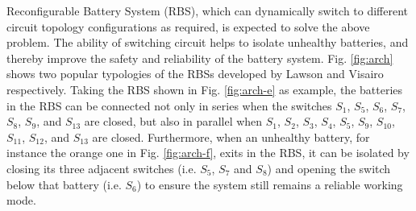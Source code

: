 \documentclass{article}
\begin{document}
Reconfigurable Battery System (RBS), which can dynamically switch to different circuit topology configurations as required, is expected to solve the above problem\cite{hanNextGenerationBatteryManagement2020a}.
The ability of switching circuit helps to isolate unhealthy batteries, and thereby improve the safety and reliability of the battery system.
Fig. \ref{fig:arch} shows two popular typologies of the RBSs developed by Lawson\cite{lawsonSoftwareConfigurableBattery2012} and Visairo \cite{visairoReconfigurableBatteryPack2008} respectively. 
Taking the RBS shown in Fig. \ref{fig:arch-e} as example, the batteries in the RBS can be connected not only in series when the switches $S_1$, $S_5$, $S_6$, $S_7$, $S_8$, $S_9$, and $S_{13}$ are closed, but also in parallel when $S_1$, $S_2$, $S_3$, $S_4$, $S_5$, $S_9$, $S_{10}$, $S_{11}$, $S_{12}$, and $S_{13}$ are closed.
Furthermore, when an unhealthy battery, for instance the orange one in Fig. \ref{fig:arch-f}, exits in the RBS, it can be isolated by closing its three adjacent switches (i.e. $S_5$, $S_7$ and $S_8$) and opening the switch below that battery (i.e. $S_6$) to ensure the system still remains a reliable working mode.
\end{document}
